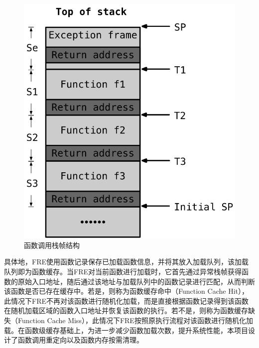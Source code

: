\documentclass[12pt,a4paper]{ctexart}
\numberwithin{figure}{section}
\begin{document}
\begin{figure}[h]
    \centering
    \includegraphics[scale=0.7]{graph/stackFrame.png}
    \caption{函数调用栈帧结构}
    \label{fig:stackFrame}
\end{figure}
\par 具体地，FRE使用函数记录保存已加载函数信息，并将其放入加载队列，该加载队列即为函数缓存。当FRE对当前函数进行加载时，它首先通过异常栈帧获得函数的原始入口地址，随后通过该地址与加载队列中的函数记录进行匹配，从而判断该函数是否已存在缓存中。若是，则称为函数缓存命中（Function Cache Hit），此情况下FRE不再对该函数进行随机化加载，而是直接根据函数记录得到该函数在随机加载区域的函数入口地址并恢复该函数的执行。若不是，则称为函数缓存缺失（Function Cache Miss），此情况下FRE按照原执行流程对该函数进行随机化加载。在函数级缓存基础上，为进一步减少函数加载次数，提升系统性能，本项目设计了函数调用重定向以及函数内存按需清理。
\end{document}
